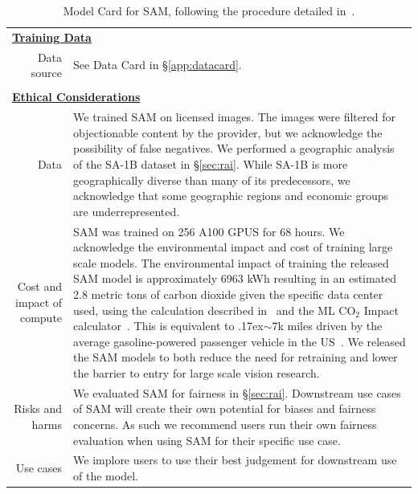 \documentclass[10pt,twocolumn,letterpaper]{article}
\newcommand{\app}{\raise.17ex\hbox{$\scriptstyle\sim$}}
\newcommand{\sad}{\mbox{SA-1B}\xspace}
\newcommand{\sam}{SAM\xspace}
\begin{document}
\begin{table}
\begin{tabular*}{\linewidth}{r|p{12cm}}
\multicolumn{2}{l}{\bf\underline{Training Data}} \\
Data source & See Data Card in \S\ref{app:datacard}. \\
\multicolumn{2}{c}{} \\
\multicolumn{2}{l}{\bf\underline{Ethical Considerations}} \\
Data &
We trained \sam on licensed images. The images were filtered for objectionable content by the provider, but we acknowledge the possibility of false negatives. We performed a geographic analysis of the \sad dataset in \S\ref{sec:rai}. While \sad is more geographically diverse than many of its predecessors, we acknowledge that some geographic regions and economic groups are underrepresented. \\
Cost and impact of compute & \sam was trained on 256 A100 GPUS for 68 hours. We acknowledge the environmental impact and cost of training large scale models. The environmental impact of training the released \sam model is approximately 6963 kWh resulting in an estimated 2.8 metric tons of carbon dioxide given the specific data center used, using the calculation described in~\cite{patterson2021carbon} and the ML CO$_2$ Impact calculator~\cite{lacoste2019quantifying}. This is equivalent to \app7k miles driven by the average gasoline-powered passenger vehicle in the US~\cite{epa2022}. We released the \sam models to both reduce the need for retraining and lower the barrier to entry for large scale vision research. \\
Risks and harms & We evaluated \sam for fairness in \S\ref{sec:rai}. Downstream use cases of \sam will create their own potential for biases and fairness concerns. As such we recommend users run their own fairness evaluation when using \sam for their specific use case. \\
Use cases & We implore users to use their best judgement for downstream use of the model. \\
\end{tabular*}
\caption{Model Card for \sam, following the procedure detailed in~\cite{mitchell2019model}.}
\label{tab:modelcard}\vspace{20mm}
\end{table}
\end{document}
